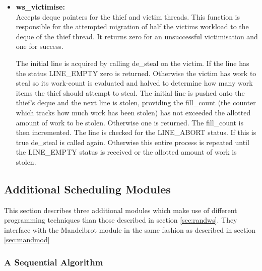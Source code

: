\begin{itemize}
\item \textbf{ws\_victimise: } \\
                Accepts deque pointers for the thief and victim threads. This function is responsible for the attempted migration of half the victims 
                workload to the deque of the thief thread. It returns zero for an unsuccessful victimisation and one for success.
                
                The initial line is acquired by calling de\_steal on the victim. If the line has the status LINE\_EMPTY zero is returned. 
                Otherwise the victim has work to steal so its work-count is evaluated and halved to determine how many work items the thief
                should attempt to steal.
                The initial line is pushed onto the thief's deque and the next line is stolen, providing the fill\_count (the counter which
                tracks how much work has been stolen) has not exceeded the allotted amount of work to be stolen. Otherwise one is returned.
                The fill\_count is then incremented. 
                The line is checked for the LINE\_ABORT status. If this is true de\_steal is called again.
                Otherwise this entire process is repeated until the LINE\_EMPTY status is received or the allotted amount of work is stolen.
                

\end{itemize}


\subsection{Additional Scheduling Modules}

This section describes three additional modules which make use of different programming 
techniques than those described in section \ref{sec:randws}. 
They interface with the Mandelbrot module in the same fashion as described in section \ref{sec:mandmod}

\subsubsection*{A Sequential Algorithm}

